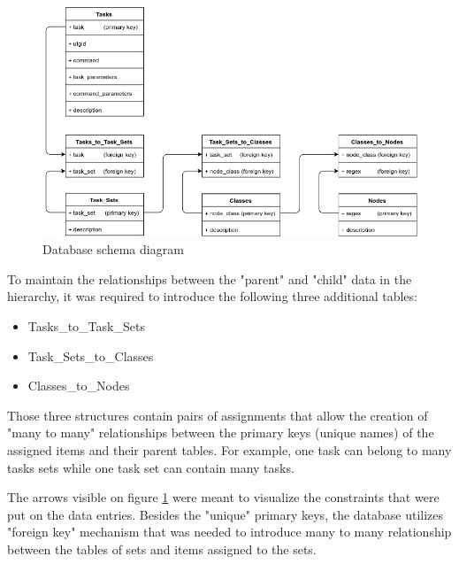 \begin{figure}[H]
\centering
    \includegraphics[scale=0.58]{images/Database_Schema.jpg}
    \caption{Database schema diagram}
    \label{fig:schema}
\end{figure}

\newpage
\noindent
To maintain the relationships between the "parent" and "child" data in the hierarchy, it was required to introduce the following three additional tables:

\begin{multicols}{3}
    \begin{itemize}
        \item Tasks\_to\_Task\_Sets
        \item Task\_Sets\_to\_Classes
        \item Classes\_to\_Nodes
    \end{itemize}
\end{multicols}

\noindent
Those three structures contain pairs of assignments that allow the creation of "many to many" relationships between the primary keys (unique names) of the assigned items and their parent tables. For example, one task can belong to many tasks sets while one task set can contain many tasks. 
\newline


\noindent
The arrows visible on figure \ref{fig:schema} were meant to visualize the constraints that were put on the data entries. Besides the "unique" primary keys, the database utilizes "foreign key" mechanism that was needed to introduce many to many relationship between the tables of sets and items assigned to the sets. 
\newline

